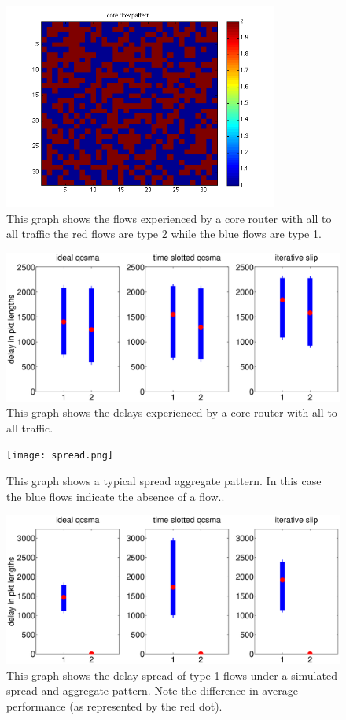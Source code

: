 \documentclass[11pt]{article}%
\begin{document}
\begin{figure}
\center
	 \includegraphics[width=90mm]{all2allflows.png}
	\caption{This graph shows the flows experienced by a core router with all to all traffic the red flows are type 2 while the blue flows are type 1.}
	\label{all_to_all_flows}
\end{figure}

\begin{figure}
\center
	 \includegraphics[width=\textwidth]{all_2_all.eps}
	\caption{This graph shows the delays experienced by a core router with all to all traffic.}
	\label{all_to_all}
\end{figure}


\begin{figure}
\center
	 \texttt{[image: spread.png]}
	\caption{This graph shows a typical spread aggregate pattern.  In this case the blue flows indicate the absence of a flow..}
	\label{spreadagg}
\end{figure}


\begin{figure}
\center
	 \includegraphics[width=\textwidth]{vs_spread.eps}
	\caption{This graph shows the delay spread of type 1 flows under a simulated spread and aggregate pattern.  Note the difference in average performance (as represented by the red dot).}
	\label{vs_spreadagg}
\end{figure}
\end{document}
